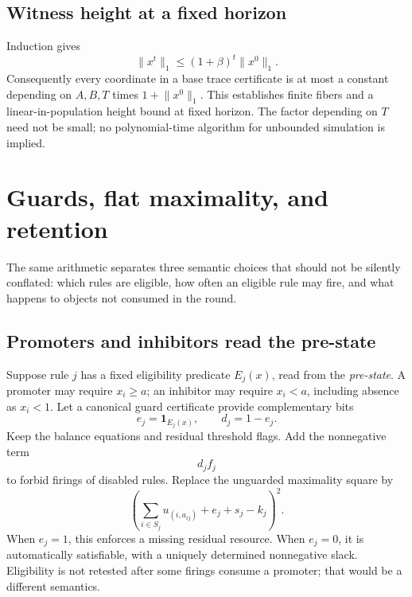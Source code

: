 \documentclass[11pt,letterpaper]{article}
\theoremstyle{definition}
\theoremstyle{remark}
\newcommand{\one}{\mathbf 1}
\newcommand{\size}[1]{\lVert #1\rVert_1}
\begin{document}
\subsection{Witness height at a fixed horizon}
Induction gives
\begin{equation}\label{qoc:mp:eq:mass}
 \size{x^t}\le(1+\beta)^t\size{x^0}.
\end{equation}
Consequently every coordinate in a base trace certificate is at most a
constant depending on $A,B,T$ times $1+\size{x^0}$. This establishes
finite fibers and a linear-in-population height bound at fixed horizon.
The factor depending on $T$ need not be small; no polynomial-time algorithm
for unbounded simulation is implied.

\section{Guards, flat maximality, and retention}\label{qoc:mp:sec:variants}
The same arithmetic separates three semantic choices that should not be
silently conflated: which rules are eligible, how often an eligible rule
may fire, and what happens to objects not consumed in the round.

\subsection{Promoters and inhibitors read the pre-state}
Suppose rule $j$ has a fixed eligibility predicate $E_j(x)$, read from the
\emph{pre-state}. A promoter may require $x_i\ge a$; an inhibitor may
require $x_i<a$, including absence as $x_i<1$. Let a canonical guard
certificate provide complementary bits
\[
 e_j=\one_{E_j(x)},\qquad d_j=1-e_j.
\]
Keep the balance equations and residual threshold flags. Add the
nonnegative term
\begin{equation}\label{qoc:mp:eq:disable}
 d_j f_j
\end{equation}
to forbid firings of disabled rules. Replace the unguarded maximality
square by
\begin{equation}\label{qoc:mp:eq:guardmax}
 \left(\sum_{i\in S_j}u_{(i,a_{ij})}+e_j+s_j-k_j\right)^2.
\end{equation}
When $e_j=1$, this enforces a missing residual resource. When $e_j=0$,
it is automatically satisfiable, with a uniquely determined nonnegative
slack. Eligibility is not retested after some firings consume a promoter;
that would be a different semantics.
\end{document}
